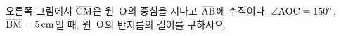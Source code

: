 \noindent\begin{minipage}[t]{0.58\linewidth}\vspace{0pt}\raggedright 오른쪽 그림에서 $\overline{\mathrm{CM}}$은 원~$\mathrm{O}$의 중심을 지나고 $\overline{\mathrm{AB}}$에 수직이다. $\angle\mathrm{AOC}=150^\circ$, $\overline{\mathrm{BM}}=5\,\mathrm{cm}$일 때, 원~$\mathrm{O}$의 반지름의 길이를 구하시오.\end{minipage}\hfill\begin{minipage}[t]{0.4\linewidth}\vspace{0pt}\centering \resizebox{\ifdim\width>\linewidth\linewidth\else\width\fi}{!}{}\end{minipage}\par
